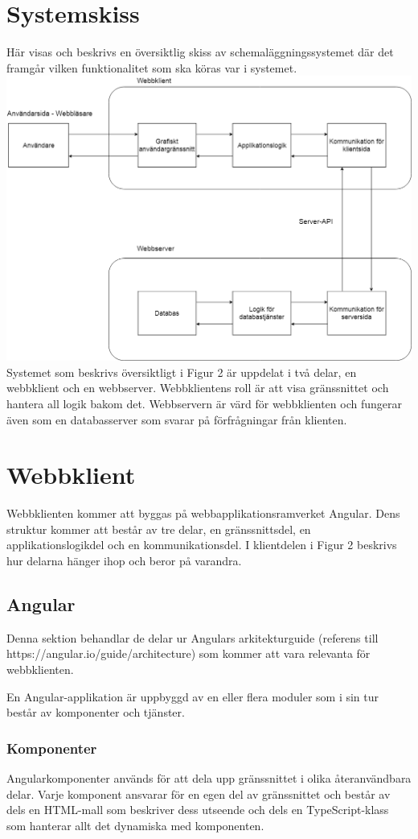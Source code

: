\documentclass[a4paper,10pt]{article}
\begin{document}
\section{Systemskiss}
\label{sec:Systemskiss}
Här visas och beskrivs en översiktlig skiss av schemaläggningssystemet där det framgår vilken funktionalitet som ska köras var i systemet. \\
\includegraphics[width=.9\linewidth,height=.7\textheight]{Systemskiss.png}
\\
Systemet som beskrivs översiktligt i Figur 2 är uppdelat i två delar, en webbklient och en webbserver. Webbklientens roll är att visa gränssnittet och hantera all logik bakom det. Webbservern är värd för webbklienten och fungerar även som en databasserver som svarar på förfrågningar från klienten.
\section{Webbklient}
Webbklienten kommer att byggas på webbapplikationsramverket Angular. Dens struktur kommer att består av tre delar, en gränssnittsdel, en applikationslogikdel och en kommunikationsdel. I klientdelen i Figur 2 beskrivs hur delarna hänger ihop och beror på varandra.

\subsection{Angular}
Denna sektion behandlar de delar ur Angulars arkitekturguide (referens till https://angular.io/guide/architecture) som kommer att vara relevanta för webbklienten.

En Angular-applikation är uppbyggd av en eller flera moduler som i sin tur består av komponenter och tjänster.
\subsubsection{Komponenter}
\label{komponent}
Angularkomponenter används för att dela upp gränssnittet i olika återanvändbara delar. Varje komponent ansvarar för en egen del av gränssnittet och består av dels en HTML-mall som beskriver dess utseende och dels en TypeScript-klass som hanterar allt det dynamiska med komponenten.
\end{document}
